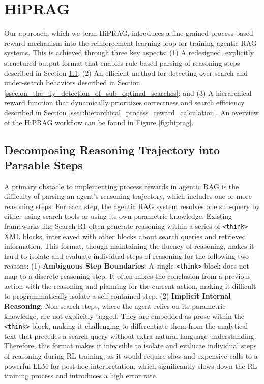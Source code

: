 \documentclass{article}
\begin{document}
\section{HiPRAG}
\label{sec:hiprag}
Our approach, which we term HiPRAG, introduces a fine-grained process-based reward mechanism into the reinforcement learning loop for training agentic RAG systems.
This is achieved through three key aspects:
(1) A redesigned, explicitly structured output format that enables rule-based parsing of reasoning steps described in Section \ref{ssec:decomposing_reasoning_trajectory_into_parsable_steps}; (2) An efficient method for detecting over-search and under-search behaviors described in Section \ref{ssec:on_the_fly_detection_of_sub_optimal_searches}; and (3) A hierarchical reward function that dynamically prioritizes correctness and search efficiency described in Section \ref{ssec:hierarchical_process_reward_calculation}. An overview of the HiPRAG workflow can be found in Figure \ref{fig:hiprag}.

\subsection{Decomposing Reasoning Trajectory into Parsable Steps}
\label{ssec:decomposing_reasoning_trajectory_into_parsable_steps}
A primary obstacle to implementing process rewards in agentic RAG is the difficulty of parsing an agent's reasoning trajectory, which includes one or more reasoning steps. For each step, the agentic RAG system resolves one sub-query by either using search tools or using its own parametric knowledge. Existing frameworks like Search-R1 often generate reasoning within a series of \texttt{<think>} XML blocks, interleaved with other blocks about search queries and retrieved information. This format, though maintaining the fluency of reasoning, makes it hard to isolate and evaluate individual steps of reasoning for the following two reasons: (1) \textbf{Ambiguous Step Boundaries}: A single \texttt{<think>} block does not map to a discrete reasoning step. It often mixes the conclusion from a previous action with the reasoning and planning for the current action, making it difficult to programmatically isolate a self-contained step. (2) \textbf{Implicit Internal Reasoning}: Non-search steps, where the agent relies on its parametric knowledge, are not explicitly tagged. They are embedded as prose within the \texttt{<think>} block, making it challenging to differentiate them from the analytical text that precedes a search query without extra natural language understanding. Therefore, this format makes it infeasible to isolate and evaluate individual steps of reasoning during RL training, as it would require slow and expensive calls to a powerful LLM for post-hoc interpretation, which significantly slows down the RL training process and introduces a high error rate.
\end{document}

